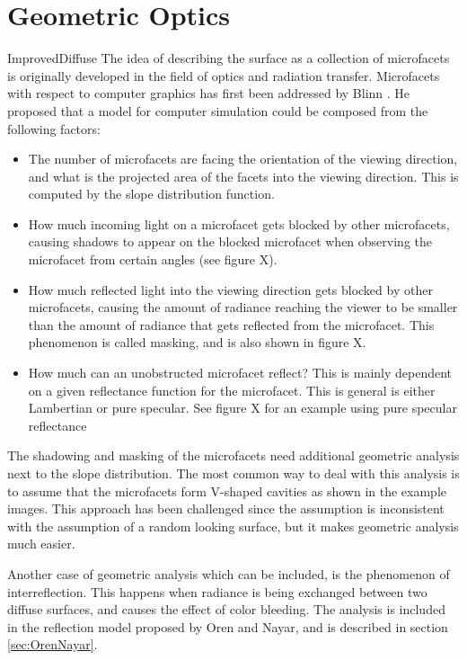 \section{Geometric Optics}ImprovedDiffuse
The idea of describing the surface as a collection of microfacets is originally developed in the field of optics and radiation transfer. Microfacets with respect to computer graphics has first been addressed by Blinn \cite{Blinn}. He proposed that a model for computer simulation could be composed from the following factors:

\begin{itemize}
	\item{ The number of microfacets are facing the orientation of the viewing direction, and what is the projected area of the facets into the viewing direction. This is computed by the slope distribution function. }
	\item{ How much incoming light on a microfacet gets blocked by other microfacets, causing shadows to appear on the blocked microfacet when observing the microfacet from certain angles (see figure X).} 
	\item{ How much reflected light into the viewing direction gets blocked by other microfacets, causing the amount of radiance reaching the viewer to be smaller than the amount of radiance that gets reflected from the microfacet. This phenomenon is called masking, and is also shown in figure X. }
	\item{ How much can an unobstructed microfacet reflect? This is mainly dependent on a given reflectance function for the microfacet. This is general is either Lambertian or pure specular. See figure X for an example using pure specular reflectance}
\end{itemize}

The shadowing and masking of the microfacets need additional geometric analysis next to the slope distribution. The most common way to deal with this analysis is to assume that the microfacets form V-shaped cavities as shown in the example images. This approach has been challenged since the assumption is inconsistent with the assumption of a random looking surface, but it makes geometric analysis much easier.

Another case of geometric analysis which can be included, is the phenomenon of interreflection. This happens when radiance is being exchanged between two diffuse surfaces, and causes the effect of color bleeding. The analysis is included in the reflection model proposed by Oren and Nayar, and is described in section \ref{sec:OrenNayar}.

